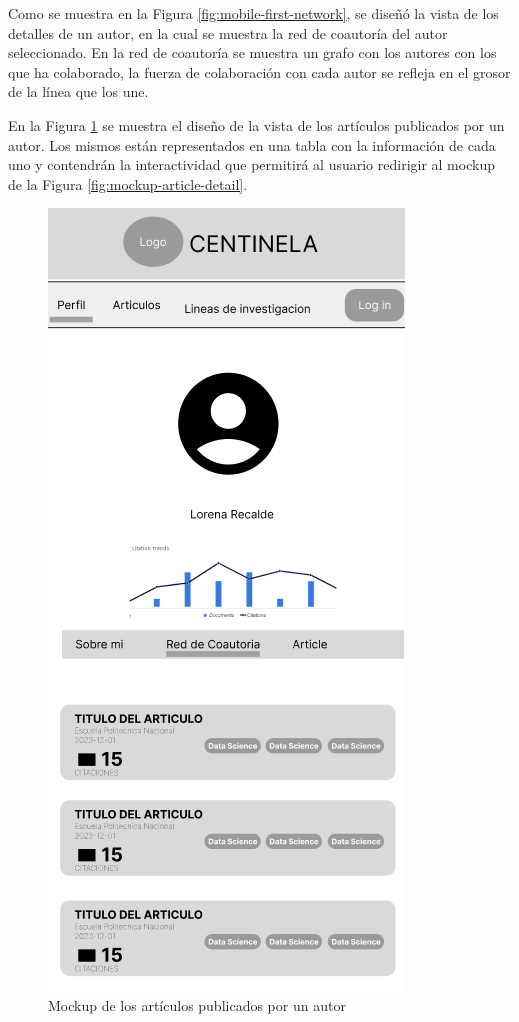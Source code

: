 Como se muestra en la Figura \ref{fig:mobile-first-network}, se diseñó la vista de los detalles de un autor, en la cual se muestra la red de coautoría del autor seleccionado. 
En la red de coautoría se muestra un grafo con los autores con los que ha colaborado, la fuerza de colaboración con cada autor se refleja en el grosor de la línea que los une.

En la Figura \ref{fig:mobile-first-articles} se muestra el diseño de la vista de los artículos publicados por un autor.
Los mismos están representados en una tabla con la información de cada uno y contendrán la interactividad que permitirá al usuario redirigir al mockup de la Figura \ref{fig:mockup-article-detail}.

\begin{figure}[H]
    \centering
    \includegraphics[scale=0.5]{../02Figures/02Chapter/Sprints/Sprint-2/mobile-first-articles.png}
    \caption{Mockup de los artículos publicados por un autor}
    \label{fig:mobile-first-articles}
\end{figure}

